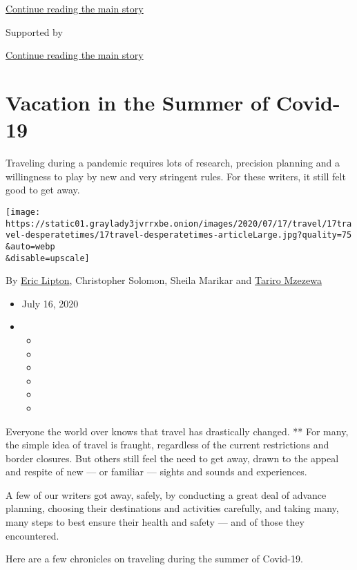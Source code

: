 \protect\hyperlink{after-top}{Continue reading the main story}

Supported by

\protect\hyperlink{after-sponsor}{Continue reading the main story}

\hypertarget{vacation-in-the-summer-of-covid-19}{%
\section{Vacation in the Summer of
Covid-19}\label{vacation-in-the-summer-of-covid-19}}

Traveling during a pandemic requires lots of research, precision
planning and a willingness to play by new and very stringent rules. For
these writers, it still felt good to get away.

\texttt{[image: https://static01.graylady3jvrrxbe.onion/images/2020/07/17/travel/17travel-desperatetimes/17travel-desperatetimes-articleLarge.jpg?quality=75\\\&auto=webp\\\&disable=upscale]}

By \href{https://www.nytimes3xbfgragh.onion/by/eric-lipton}{Eric
Lipton}, Christopher Solomon, Sheila Marikar and
\href{https://www.nytimes3xbfgragh.onion/by/tariro-mzezewa}{Tariro
Mzezewa}

\begin{itemize}
\item
  July 16, 2020
\item
  \begin{itemize}
  \item
  \item
  \item
  \item
  \item
  \item
  \end{itemize}
\end{itemize}

Everyone the world over knows that travel has drastically changed. **
For many, the simple idea of travel is fraught, regardless of the
current restrictions and border closures. But others still feel the need
to get away, drawn to the appeal and respite of new --- or familiar ---
sights and sounds and experiences.

A few of our writers got away, safely, by conducting a great deal of
advance planning, choosing their destinations and activities carefully,
and taking many, many steps to best ensure their health and safety ---
and of those they encountered.

Here are a few chronicles on traveling during the summer of Covid-19.

